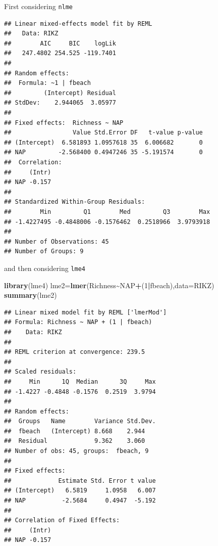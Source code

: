 \documentclass[
]{book}
\newenvironment{Shaded}{\begin{snugshade}}{\end{snugshade}}
\newcommand{\AttributeTok}[1]{\textcolor[rgb]{0.13,0.29,0.53}{#1}}
\newcommand{\DecValTok}[1]{\textcolor[rgb]{0.00,0.00,0.81}{#1}}
\newcommand{\FunctionTok}[1]{\textcolor[rgb]{0.13,0.29,0.53}{\textbf{#1}}}
\newcommand{\NormalTok}[1]{#1}
\newcommand{\OtherTok}[1]{\textcolor[rgb]{0.56,0.35,0.01}{#1}}
\newcommand{\SpecialCharTok}[1]{\textcolor[rgb]{0.81,0.36,0.00}{\textbf{#1}}}
\begin{document}
First considering \texttt{nlme}

\begin{Shaded}
\end{Shaded}

\begin{verbatim}
## Linear mixed-effects model fit by REML
##   Data: RIKZ 
##        AIC     BIC    logLik
##   247.4802 254.525 -119.7401
## 
## Random effects:
##  Formula: ~1 | fbeach
##         (Intercept) Residual
## StdDev:    2.944065  3.05977
## 
## Fixed effects:  Richness ~ NAP 
##                 Value Std.Error DF   t-value p-value
## (Intercept)  6.581893 1.0957618 35  6.006682       0
## NAP         -2.568400 0.4947246 35 -5.191574       0
##  Correlation: 
##     (Intr)
## NAP -0.157
## 
## Standardized Within-Group Residuals:
##        Min         Q1        Med         Q3        Max 
## -1.4227495 -0.4848006 -0.1576462  0.2518966  3.9793918 
## 
## Number of Observations: 45
## Number of Groups: 9
\end{verbatim}

and then considering \texttt{lme4}

\begin{Shaded}
\begin{Highlighting}[]
\FunctionTok{library}\NormalTok{(lme4)}
\NormalTok{lme2}\OtherTok{=}\FunctionTok{lmer}\NormalTok{(Richness}\SpecialCharTok{\textasciitilde{}}\NormalTok{NAP}\SpecialCharTok{+}\NormalTok{(}\DecValTok{1}\SpecialCharTok{|}\NormalTok{fbeach),}\AttributeTok{data=}\NormalTok{RIKZ)}
\FunctionTok{summary}\NormalTok{(lme2)}
\end{Highlighting}
\end{Shaded}

\begin{verbatim}
## Linear mixed model fit by REML ['lmerMod']
## Formula: Richness ~ NAP + (1 | fbeach)
##    Data: RIKZ
## 
## REML criterion at convergence: 239.5
## 
## Scaled residuals: 
##     Min      1Q  Median      3Q     Max 
## -1.4227 -0.4848 -0.1576  0.2519  3.9794 
## 
## Random effects:
##  Groups   Name        Variance Std.Dev.
##  fbeach   (Intercept) 8.668    2.944   
##  Residual             9.362    3.060   
## Number of obs: 45, groups:  fbeach, 9
## 
## Fixed effects:
##             Estimate Std. Error t value
## (Intercept)   6.5819     1.0958   6.007
## NAP          -2.5684     0.4947  -5.192
## 
## Correlation of Fixed Effects:
##     (Intr)
## NAP -0.157
\end{verbatim}
\end{document}
